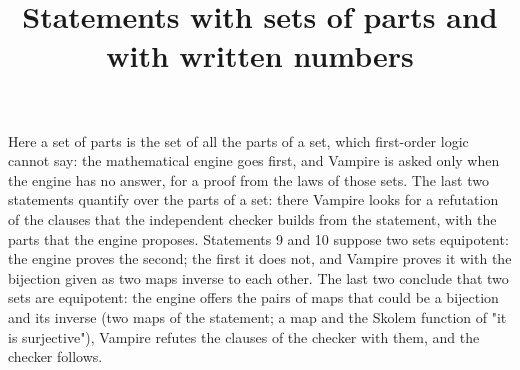 \documentclass{article}
\title{Statements with sets of parts and with written numbers}
\begin{document}
\maketitle
Here a set of parts is the set of all the parts of a set, which first-order
logic cannot say: the mathematical engine goes first, and Vampire is asked
only when the engine has no answer, for a proof from the laws of those sets.
The last two statements quantify over the parts of a set: there Vampire
looks for a refutation of the clauses that the independent checker builds
from the statement, with the parts that the engine proposes. Statements 9
and 10 suppose two sets equipotent: the engine proves the second; the first
it does not, and Vampire proves it with the bijection given as two maps
inverse to each other. The last two conclude that two sets are equipotent:
the engine offers the pairs of maps that could be a bijection and its
inverse (two maps of the statement; a map and the Skolem function of "it is
surjective"), Vampire refutes the clauses of the checker with them, and the
checker follows.
\end{document}
